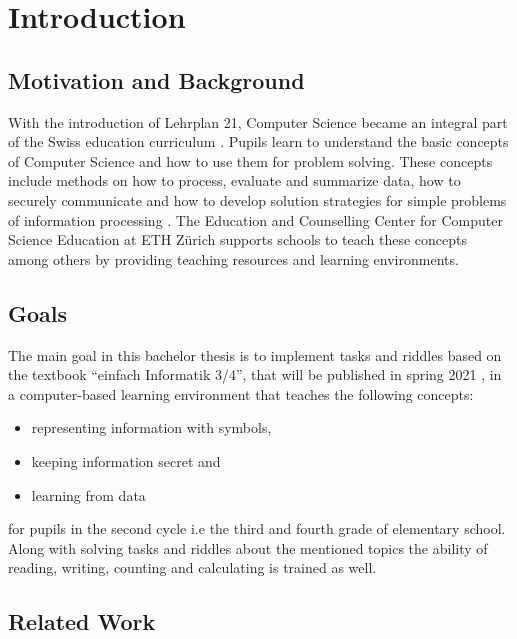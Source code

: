 \chapter{Introduction}

\section{Motivation and Background}

With the introduction of Lehrplan 21, Computer Science became an integral part of the Swiss education curriculum \cite{Lehrplan21}. Pupils learn to understand the basic concepts of Computer Science and how to use them for problem solving. These concepts include methods on how to process, evaluate and summarize data, how to securely communicate and how to develop solution strategies for simple problems of information processing \cite{MedienUndInformatik}. The Education and Counselling Center for Computer Science Education at ETH Zürich \cite{ABZ} supports schools to teach these concepts among others by providing teaching resources and learning environments.

\section{Goals}

The main goal in this bachelor thesis is to implement tasks and riddles based on the textbook “einfach Informatik 3/4”, that will be published in spring 2021 \cite{EinfachInformatik}, in a computer-based learning environment that teaches the following concepts:

\begin{itemize}
    \item representing information with symbols,
    \item keeping information secret and
    \item learning from data
\end{itemize}

for pupils in the second cycle i.e the third and fourth grade of elementary school.
Along with solving tasks and riddles about the mentioned topics the ability of reading, writing, counting and calculating is trained as well.

\section{Related Work}


